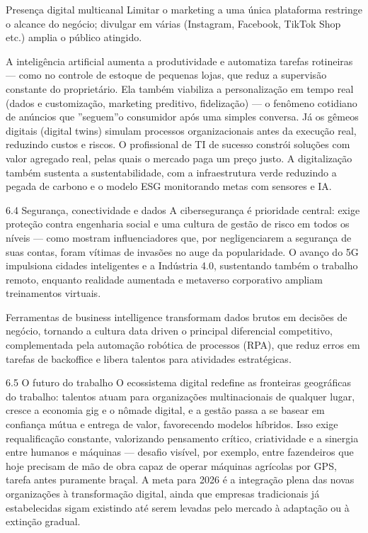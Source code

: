 Presença digital multicanal Limitar o marketing a uma única plataforma restringe o alcance do negócio; divulgar em várias (Instagram, Facebook, TikTok Shop etc.) amplia o público atingido.

A inteligência artificial aumenta a produtividade e automatiza tarefas rotineiras — como no controle de estoque de pequenas lojas, que reduz a supervisão constante do proprietário. Ela também viabiliza a personalização em tempo real (dados e customização, marketing preditivo, fidelização) — o fenômeno cotidiano de anúncios que ”seguem”o consumidor após uma simples conversa. Já os gêmeos digitais (digital twins) simulam processos organizacionais antes da execução real, reduzindo custos e riscos. O profissional de TI de sucesso constrói soluções com valor agregado real, pelas quais o mercado paga um preço justo. A digitalização também sustenta a sustentabilidade, com a infraestrutura verde reduzindo a pegada de carbono e o modelo ESG monitorando metas com sensores e IA.

6.4 Segurança, conectividade e dados A cibersegurança é prioridade central: exige proteção contra engenharia social e uma cultura de gestão de risco em todos os níveis — como mostram influenciadores que, por negligenciarem a segurança de suas contas, foram vítimas de invasões no auge da popularidade. O avanço do 5G impulsiona cidades inteligentes e a Indústria 4.0, sustentando também o trabalho remoto, enquanto realidade aumentada e metaverso corporativo ampliam treinamentos virtuais.

Ferramentas de business intelligence transformam dados brutos em decisões de negócio, tornando a cultura data driven o principal diferencial competitivo, complementada pela automação robótica de processos (RPA), que reduz erros em tarefas de backoﬀice e libera talentos para atividades estratégicas.

6.5 O futuro do trabalho O ecossistema digital redefine as fronteiras geográficas do trabalho: talentos atuam para organizações multinacionais de qualquer lugar, cresce a economia gig e o nômade digital, e a gestão passa a se basear em confiança mútua e entrega de valor, favorecendo modelos híbridos. Isso exige requalificação constante, valorizando pensamento crítico, criatividade e a sinergia entre humanos e máquinas — desafio visível, por exemplo, entre fazendeiros que hoje precisam de mão de obra capaz de operar máquinas agrícolas por GPS, tarefa antes puramente braçal. A meta para 2026 é a integração plena das novas organizações à transformação digital, ainda que empresas tradicionais já estabelecidas sigam existindo até serem levadas pelo mercado à adaptação ou à extinção gradual.

